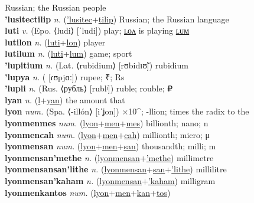 Russian; the Russian people \label{'lusitecwon} \\
\textbf{'lusitectilip} \textit{n.} (\hyperref['lusitec]{'lusitec}+\hyperref[tilip]{tilip})
Russian; the Russian language \label{'lusitectilip} \\
\textbf{luti} \textit{v.} (Epo. ⟨ludi⟩ [ˈludi])
play; \hyperref[lutilon]{ʟᴏᴧ} is playing \hyperref[lutilum]{ʟᴜᴍ} \label{luti} \\
\textbf{lutilon} \textit{n.} (\hyperref[luti]{luti}+\hyperref[lon]{lon})
player \label{lutilon} \\
\textbf{lutilum} \textit{n.} (\hyperref[luti]{luti}+\hyperref[lum]{lum})
game; sport \label{lutilum} \\
\textbf{'lupitium} \textit{n.} (Lat. ⟨rubidium⟩ [rʊbidɪʊ̃])
rubidium \label{'lupitium} \\
\textbf{'lupya} \textit{n.} ( [ɾʊpjɑː])
rupee; ₹; Rs \label{'lupya} \\
\textbf{'lupli} \textit{n.} (Rus. ⟨рубль⟩ [rublʲ])
ruble; rouble; ₽ \label{'lupli} \\
\textbf{lyan} \textit{n.} (\hyperref[l]{l}+\hyperref[yan]{yan})
the amount that \label{lyan} \\
\textbf{lyon} \textit{num.} (Spa. ⟨-illón⟩ [iˈʝon])
×10\textasciicircum{}; -llion; times the radix to the \label{lyon} \\
\textbf{lyonmenmes} \textit{num.} (\hyperref[lyon]{lyon}+\hyperref[men]{men}+\hyperref[mes]{mes})
billionth; nano; n \label{lyonmenmes} \\
\textbf{lyonmencah} \textit{num.} (\hyperref[lyon]{lyon}+\hyperref[men]{men}+\hyperref[cah]{cah})
millionth; micro; μ \label{lyonmencah} \\
\textbf{lyonmensan} \textit{num.} (\hyperref[lyon]{lyon}+\hyperref[men]{men}+\hyperref[san]{san})
thousandth; milli; m \label{lyonmensan} \\
\textbf{lyonmensan'methe} \textit{n.} (\hyperref[lyonmensan]{lyonmensan}+\hyperref['methe]{'methe})
millimetre \label{lyonmensan'methe} \\
\textbf{lyonmensansan'lithe} \textit{n.} (\hyperref[lyonmensan]{lyonmensan}+\hyperref[san]{san}+\hyperref['lithe]{'lithe})
millilitre \label{lyonmensansan'lithe} \\
\textbf{lyonmensan'kaham} \textit{n.} (\hyperref[lyonmensan]{lyonmensan}+\hyperref['kaham]{'kaham})
milligram \label{lyonmensan'kaham} \\
\textbf{lyonmenkantos} \textit{num.} (\hyperref[lyon]{lyon}+\hyperref[men]{men}+\hyperref[kan]{kan}+\hyperref[tos]{tos})
